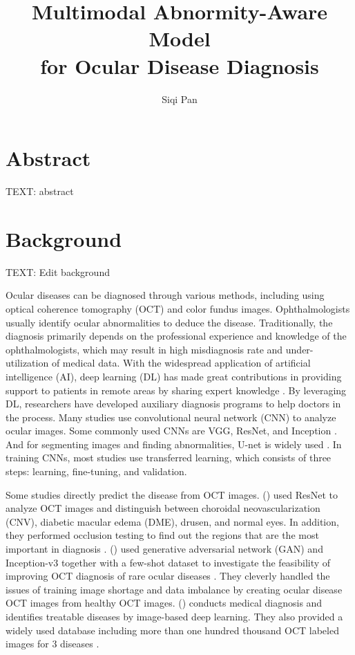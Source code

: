 \documentclass{article}
\newcommand{\authyear}[1]{\citeauthor{#1} (\citeyear{#1})}
\begin{document}
	\title{\vspace{-2.25cm} Multimodal Abnormity-Aware Model\\for Ocular Disease Diagnosis}
	\author{Siqi Pan}
	\date{}
	\maketitle
	
	\section*{Abstract}
	
	TEXT: abstract
	
	\pagebreak
	\tableofcontents
	\pagebreak
	
	\section{Background}
		
		TEXT: Edit background
		
		Ocular diseases can be diagnosed through various methods, including using optical coherence tomography (OCT) and color fundus images. Ophthalmologists usually identify ocular abnormalities to deduce the disease.  Traditionally, the diagnosis primarily depends on the professional experience and knowledge of the ophthalmologists, which may result in high misdiagnosis rate and under-utilization of medical data.  With the widespread application of artificial intelligence (AI), deep learning (DL) has made great contributions in providing support to patients in remote areas by sharing expert knowledge \autocite{Ichhpujani_Thakur_2021}.  By leveraging DL, researchers have developed auxiliary diagnosis programs to help doctors in the process. Many studies use convolutional neural network (CNN) to analyze ocular images. Some commonly used CNNs are VGG, ResNet, and Inception \autocite{daich2023artificial}.  And for segmenting images and finding abnormalities, U-net is widely used \autocite{Ronneberger_Fischer_Brox_2015}. In training CNNs, most studies use transferred learning, which consists of three steps: learning, fine-tuning, and validation.
		
		Some studies directly predict the disease from OCT images.
		\authyear{li2019deep} used ResNet to analyze OCT images and distinguish between choroidal neovascularization (CNV), diabetic macular edema (DME), drusen, and normal eyes. In addition, they performed occlusion testing to find out the regions that are the most important in diagnosis \autocite{li2019deep}. 
		\authyear{yoo2021feasibility} used generative adversarial network (GAN) and Inception-v3 together with a few-shot dataset to investigate the feasibility of improving OCT diagnosis of rare ocular diseases \autocite{yoo2021feasibility}.  They cleverly handled the issues of training image shortage and data imbalance by creating ocular disease OCT images from healthy OCT images. \authyear{Kermany2018} conducts medical diagnosis and identifies treatable diseases by image-based deep learning.  They also provided a widely used database including more than one hundred thousand OCT labeled images for 3 diseases \autocite{Kermany2018}.
		
\end{document}
